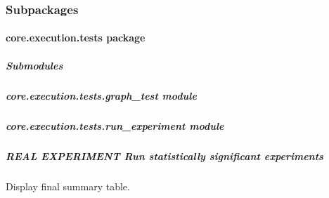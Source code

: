 \documentclass[letterpaper,10pt,english]{sphinxmanual}
\begin{document}
\subsubsection{Subpackages}
\label{\detokenize{core.execution:subpackages}}
\sphinxstepscope


\paragraph{core.execution.tests package}
\label{\detokenize{core.execution.tests:core-execution-tests-package}}\label{\detokenize{core.execution.tests::doc}}

\subparagraph{Submodules}
\label{\detokenize{core.execution.tests:submodules}}
\sphinxstepscope


\subparagraph{core.execution.tests.graph\_test module}
\label{\detokenize{core.execution.tests.graph_test:module-core.execution.tests.graph_test}}\label{\detokenize{core.execution.tests.graph_test:core-execution-tests-graph-test-module}}\label{\detokenize{core.execution.tests.graph_test::doc}}
\sphinxstepscope


\subparagraph{core.execution.tests.run\_experiment module}
\label{\detokenize{core.execution.tests.run_experiment:module-core.execution.tests.run_experiment}}\label{\detokenize{core.execution.tests.run_experiment:core-execution-tests-run-experiment-module}}\label{\detokenize{core.execution.tests.run_experiment::doc}}

\subparagraph{REAL EXPERIMENT \textendash{} Run statistically significant experiments}
\label{\detokenize{core.execution.tests.run_experiment:real-experiment-run-statistically-significant-experiments}}

\begin{fulllineitems}
\label{\detokenize{core.execution.tests.run_experiment:core.execution.tests.run_experiment.display_master_summary}}
\pysigstartsignatures
\pysiglinewithargsret
{}
{}
{}
\pysigstopsignatures
\sphinxAtStartPar
Display final summary table.

\end{fulllineitems}
\end{document}
